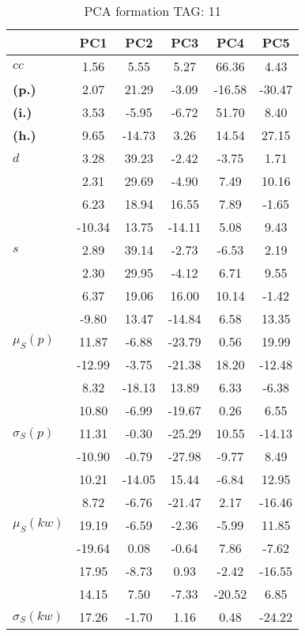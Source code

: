 \begin{table}[h!]
\begin{center}
\caption{PCA formation TAG: 11}
	\label{tab:tpca}
\begin{tabular}{| l || c | c | c | c | c |}\hline
 & {\bf PC1} & {\bf PC2} & {\bf PC3} & {\bf PC4} & {\bf PC5} \\\hline\hline
{\bf $cc$} & 1.56 & 5.55 & 5.27 & 66.36 & 4.43 \\
{\bf (p.)} & 2.07 & 21.29 & -3.09 & -16.58 & -30.47 \\
{\bf (i.)} & 3.53 & -5.95 & -6.72 & 51.70 & 8.40 \\
{\bf (h.)} & 9.65 & -14.73 & 3.26 & 14.54 & 27.15 \\\hline
{\bf $d$} & 3.28 & 39.23 & -2.42 & -3.75 & 1.71 \\
{\bf } & 2.31 & 29.69 & -4.90 & 7.49 & 10.16 \\
{\bf } & 6.23 & 18.94 & 16.55 & 7.89 & -1.65 \\
{\bf } & -10.34 & 13.75 & -14.11 & 5.08 & 9.43 \\\hline
{\bf $s$} & 2.89 & 39.14 & -2.73 & -6.53 & 2.19 \\
{\bf } & 2.30 & 29.95 & -4.12 & 6.71 & 9.55 \\
 & 6.37  & 19.06  & 16.00  & 10.14  & -1.42 \\
 & -9.80  & 13.47  & -14.84  & 6.58  & 13.35 \\\hline
$\mu_S(p)$ & 11.87  & -6.88  & -23.79  & 0.56  & 19.99 \\
 & -12.99  & -3.75  & -21.38  & 18.20  & -12.48 \\
 & 8.32  & -18.13  & 13.89  & 6.33  & -6.38 \\
 & 10.80  & -6.99  & -19.67  & 0.26  & 6.55 \\\hline
$\sigma_S(p)$ & 11.31  & -0.30  & -25.29  & 10.55  & -14.13 \\
 & -10.90  & -0.79  & -27.98  & -9.77  & 8.49 \\
 & 10.21  & -14.05  & 15.44  & -6.84  & 12.95 \\
 & 8.72  & -6.76  & -21.47  & 2.17  & -16.46 \\\hline
$\mu_S(kw)$ & 19.19  & -6.59  & -2.36  & -5.99  & 11.85 \\
 & -19.64  & 0.08  & -0.64  & 7.86  & -7.62 \\
 & 17.95  & -8.73  & 0.93  & -2.42  & -16.55 \\
 & 14.15  & 7.50  & -7.33  & -20.52  & 6.85 \\\hline
$\sigma_S(kw)$ & 17.26  & -1.70  & 1.16  & 0.48  & -24.22 \\

\end{tabular}
\end{center}
\end{table}
